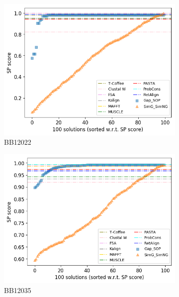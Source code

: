 \begin{figure}[!htbp]
\begin{adjustwidth}{-1cm}{-1cm}
		\begin{subfigure}{0.22\textwidth}
			\includegraphics[width=\columnwidth]{Figure/summary/precomputedInit/Balibase/BB12022_pairs_density_single_run_2}
			\caption{BB12022}
		\end{subfigure}
		\begin{subfigure}{0.22\textwidth}
			\includegraphics[width=\columnwidth]{Figure/summary/precomputedInit/Balibase/BB12035_pairs_density_single_run_2}
			\caption{BB12035}
		\end{subfigure}
		\begin{subfigure}{0.22\textwidth}

\end{subfigure}
\end{adjustwidth}
\end{figure}
